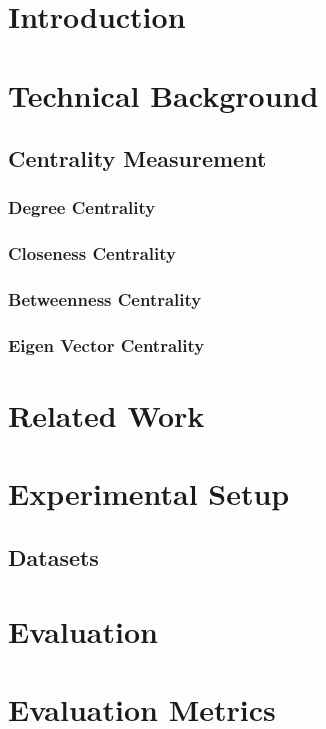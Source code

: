 \documentclass[sigconf]{acmart}
\begin{document}
\section{Introduction}

\section{Technical Background}

\subsection{Centrality Measurement}
\subsubsection{Degree Centrality}


\subsubsection{Closeness Centrality}

\subsubsection{Betweenness Centrality}

\subsubsection{Eigen Vector Centrality}


\section{Related Work}


\section{Experimental Setup}

\subsection{Datasets}


\section{Evaluation}



\section{Evaluation Metrics}
\end{document}
